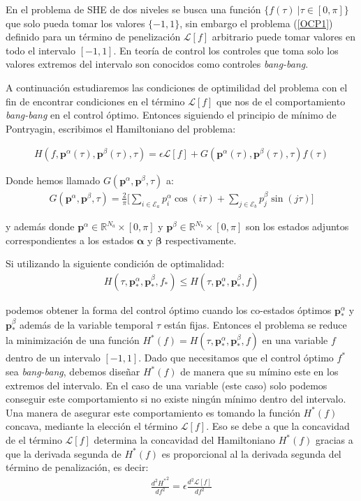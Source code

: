 En el problema de SHE de dos niveles se busca una función $\{f(\tau) \ |  \tau \in [0,\pi] \}$  que solo pueda tomar los valores $\{-1,1\}$, sin embargo el problema (\ref{OCP1}) definido para un término de penelización $\mathcal{L}[f]$ arbitrario puede tomar valores en todo el intervalo $[-1,1]$. 
%
En teoría de control los controles que toma solo los valores extremos del intervalo son conocidos como controles \emph{bang-bang}. 

A continuación estudiaremos las condiciones de optimilidad del problema con el fin de encontrar condiciones en el término $\mathcal{L}[f]$ que nos de el comportamiento \emph{bang-bang} en el control óptimo. Entonces siguiendo el principio de mínimo de Pontryagin, escribimos el Hamiltoniano del problema:

\begin{gather}\label{hamil}
    H(f,\bm{p}^\alpha(\tau),\bm{p}^\beta(\tau),\tau) = \epsilon \mathcal{L}[f] + 
    G(\bm{p}^\alpha(\tau),\bm{p}^\beta(\tau),\tau) f(\tau)
\end{gather}

Donde  hemos llamado $G(\bm{p}^\alpha,\bm{p}^\beta,\tau)$ a:
    \begin{gather}
        G(\bm{p}^\alpha,\bm{p}^\beta,\tau) = \frac{2}{\pi} \Bigg[ 
            \sum_{i \in \mathcal{E}_a} p^\alpha_i \cos(i\tau)+ 
            \sum_{j \in \mathcal{E}_b} p^\beta_j \sin(j\tau) 
        \Bigg]
    \end{gather}

y además donde $\bm{p}^\alpha \in \mathbb{R}^{N_a} \times [0,\pi]$ y $\bm{p}^\beta \in \mathbb{R}^{N_b}  \times [0,\pi]$ son los estados adjuntos correspondientes a los estados $\bm{\alpha}$ y $\bm{\beta}$ respectivamente. 
\newline 

Si utilizando la siguiente condición de optimalidad:
\begin{gather}\label{minH}
    H(\tau,\bm{p}_*^\alpha,\bm{p}^\beta_*,f_*) \leq
    H(\tau,\bm{p}_*^\alpha,\bm{p}^\beta_*,f)
\end{gather}

podemos obtener la forma del control óptimo cuando los co-estados óptimos $\bm{p}_*^\alpha$ y $\bm{p}_*^\beta$ además de la variable temporal $\tau$ están fijas. 
%
Entonces el problema se reduce la minimización de una función $H^*(f) = H(\tau,\bm{p}_*^\alpha,\bm{p}^\beta_*,f)$ en una variable $f$ dentro de un intervalo $[-1,1]$.
%
Dado que necesitamos que el control óptimo $f^*$ sea \emph{bang-bang}, debemos diseñar  $H^*(f)$ de manera que su mímino este en los extremos del intervalo.
%
En el caso de una variable (este caso) solo podemos conseguir este comportamiento si no existe ningún mínimo dentro del intervalo. Una manera de asegurar este comportamiento es tomando la función $H^*(f)$ concava, mediante la elección el término $\mathcal{L}[f]$. Eso se debe a que la concavidad de el término $\mathcal{L}[f]$ determina la concavidad del Hamiltoniano $H^*(f)$ gracias a que la derivada segunda de $H^*(f)$ es proporcional al la derivada segunda del término de penalización, es decir:
\begin{gather}
    \frac{d^2{H^*}^2}{df^2} = \epsilon \frac{d^2\mathcal{L}[f]}{df^2} 
\end{gather}

